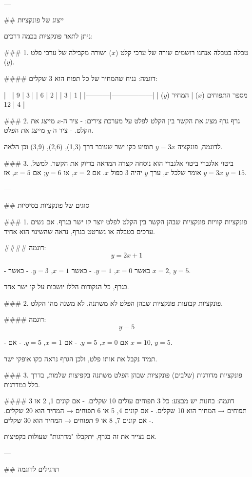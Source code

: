 ---

## ייצוג של פונקציות

ניתן לתאר פונקציות בכמה דרכים:

### 1. טבלה
בטבלה אנחנו רושמים שורה של ערכי קלט ($x$) ושורה מקבילה של ערכי פלט ($y$). 

#### דוגמה:
נניח שהמחיר של כל תפוח הוא 3 שקלים:

| מספר התפוחים ($x$) | המחיר ($y$) |
|------------------|-----------|
| 1                | 3         |
| 2                | 6         |
| 3                | 9         |
| 4                | 12        |

### 2. גרף
גרף מציג את הקשר בין הקלט לפלט על מערכת צירים: 
- ציר ה-$x$ מייצג את הקלט.
- ציר ה-$y$ מייצג את הפלט.

לדוגמה, פונקציה $y = 3x$ תופיע כקו ישר שעובר דרך (1,3), (2,6), (3,9) וכן הלאה.

### 3. ביטוי אלגברי
ביטוי אלגברי הוא נוסחה קצרה המראה בדיוק את הקשר. 
למשל, $y = 3x$ אומר שלכל $x$, ערך $y$ יהיה 3 כפול $x$. 
אם $x = 2$, אז $y = 6$; אם $x = 5$, אז $y = 15$.

---

## סוגים של פונקציות בסיסיות

### 1. פונקציות קוויות
פונקציות שבהן הקשר בין הקלט לפלט יוצר קו ישר בגרף. אם נשים ערכים בטבלה או נשרטט בגרף, נראה שהשינוי הוא אחיד.

#### דוגמה:
$$
 y = 2x + 1 
$$

- כאשר $x = 0$, $y = 1$.
- כאשר $x = 1$, $y = 3$.
- כאשר $x = 2$, $y = 5$.

בגרף, כל הנקודות הללו יושבות על קו ישר אחד.

### 2. פונקציות קבועות
פונקציות שבהן הפלט לא משתנה, לא משנה מהו הקלט.

#### דוגמה:
$$
 y = 5 
$$

- אם $x = 0$, $y = 5$.
- אם $x = 1$, $y = 5$.
- אם $x = 10$, $y = 5$.

תמיד נקבל את אותו פלט, ולכן הגרף נראה כקו אופקי ישר.

### 3. פונקציות מדורגות (שלבים)
פונקציות שבהן הפלט משתנה בקפיצות שלמות, בדרך כלל במדרגות.

#### דוגמה:
בחנות יש מבצע: כל 3 תפוחים עולים 10 שקלים. 
- אם קונים 1, 2 או 3 תפוחים → המחיר הוא 10 שקלים.
- אם קונים 4, 5 או 6 תפוחים → המחיר הוא 20 שקלים.
- אם קונים 7, 8 או 9 תפוחים → המחיר הוא 30 שקלים.

אם נצייר את זה בגרף, יתקבלו "מדרגות" שעולות בקפיצות.

---

## תרגילים לדוגמה

